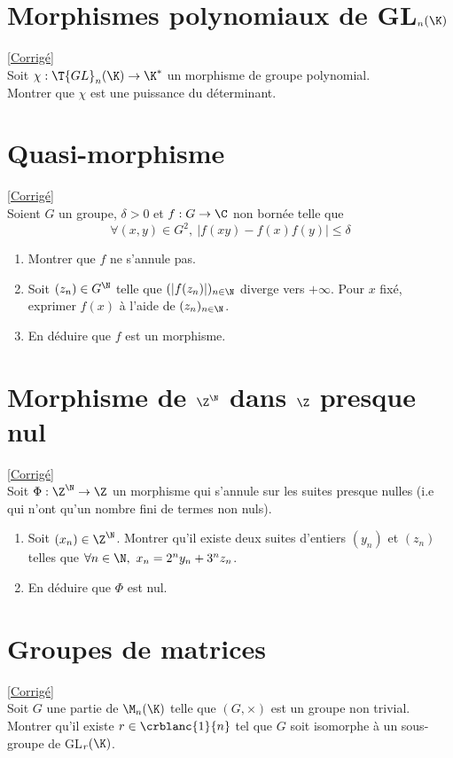 \documentclass[8pt]{book}
\begin{document}
	\section{Morphismes polynomiaux de GL$_n(\K)$ }
	\label{Morphismes polynomiaux de GLn(K)}
	\textcolor{blue}{\hyperref[Morphismes polynomiaux de GLn(K) corrigé]{[Corrigé]}}\\
	Soit $\chi:\T{GL}_n(\K)\to \K^*$ un morphisme de groupe polynomial.\\ Montrer que $\chi$ est une puissance du déterminant.
	
	\section{Quasi-morphisme }
	\label{Quasi-morphisme}
	\textcolor{blue}{\hyperref[Quasi-morphisme corrigé]{[Corrigé]}}\\
	Soient $G$ un groupe, $\delta>0$ et $f:G\to \C$ non bornée telle que
	$$\forall (x,y)\in G^2,\ |f(xy)-f(x)f(y)|\leq \delta$$
	\begin{enumerate}
		\item Montrer que $f$ ne s'annule pas.
		\item Soit $(z_n)\in G^\N$ telle que $(|f(z_n)|)_{n\in \N}$ diverge vers $+\infty$. Pour $x$ fixé, exprimer $f(x)$ à l'aide de $(z_n)_{n\in \N}$.
		\item En déduire que $f$ est un morphisme.
	\end{enumerate}
	
	\section{Morphisme de $\Z^\N$ dans $\Z$ presque nul }
	\label{Morphisme de Z^N dans Z presque nul}
	\textcolor{blue}{\hyperref[Morphisme de Z^N dans Z presque nul corrigé]{[Corrigé]}}\\
	Soit $\Phi:\Z^\N\to\Z$ un morphisme qui s'annule sur les suites presque nulles (i.e qui n'ont qu'un nombre fini de termes non nuls).
	\begin{enumerate}
		\item Soit $(x_n)\in \Z^\N$. Montrer qu'il existe deux suites d'entiers $(y_n)$ et $(z_n)$ telles que $\forall n\in \N,\ x_n=2^ny_n+3^nz_n$.
		\item En déduire que $\Phi$ est nul.
	\end{enumerate}

	\section{Groupes de matrices }
	\label{Groupes de matrices}
	\textcolor{blue}{\hyperref[Groupes de matrices corrigé]{[Corrigé]}}\\
	Soit $G$ une partie de $\M_n(\K)$ telle que $(G,\times)$ est un groupe non trivial.\\
	Montrer qu'il existe $r\in \crblanc{1}{n}$ tel que $G$ soit isomorphe à un sous-groupe de GL$_r(\K)$.
	
\end{document}
